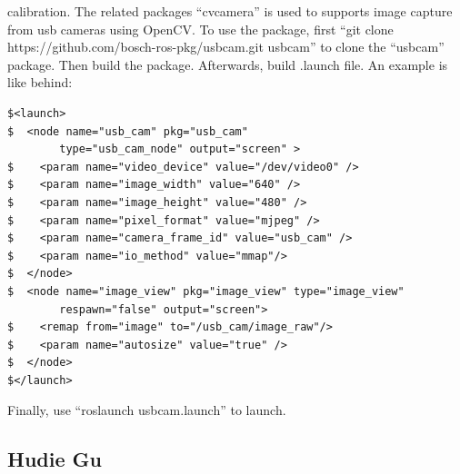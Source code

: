 \documentclass[10pt,twocolumn,letterpaper]{article}
\begin{document}
\begin{enumerate}
calibration. The related packages “cv\underline{\hspace{0.5em}}camera” is used to supports image capture from usb cameras using OpenCV. To use the package, first “git clone https://github.com/bosch-ros-pkg/usb\underline{\hspace{0.5em}}cam.git usb\underline{\hspace{0.5em}}cam” to clone the “usb\underline{\hspace{0.5em}}cam” package. Then  build the package. Afterwards, build .launch file. An example is like behind:

\lstset{
    xleftmargin=2em,xrightmargin=2em, aboveskip=1em,
    framexleftmargin=2em
} 

\begin{lstlisting}
$<launch>
$  <node name="usb_cam" pkg="usb_cam" 
        type="usb_cam_node" output="screen" >
$    <param name="video_device" value="/dev/video0" />
$    <param name="image_width" value="640" />
$    <param name="image_height" value="480" />
$    <param name="pixel_format" value="mjpeg" />
$    <param name="camera_frame_id" value="usb_cam" />
$    <param name="io_method" value="mmap"/>
$  </node>
$  <node name="image_view" pkg="image_view" type="image_view"
        respawn="false" output="screen">
$    <remap from="image" to="/usb_cam/image_raw"/>
$    <param name="autosize" value="true" />
$  </node>
$</launch>
\end{lstlisting}

\begin{flushleft}
Finally, use “roslaunch usb\underline{\hspace{0.5em}}cam.launch” to launch.
\end{flushleft}

\end{enumerate}

\subsection{Hudie Gu}
\end{document}
